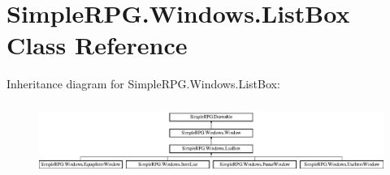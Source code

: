 \hypertarget{class_simple_r_p_g_1_1_windows_1_1_list_box}{\section{Simple\-R\-P\-G.\-Windows.\-List\-Box Class Reference}
\label{class_simple_r_p_g_1_1_windows_1_1_list_box}
}
Inheritance diagram for Simple\-R\-P\-G.\-Windows.\-List\-Box\-:\begin{figure}[H]
\begin{center}
\leavevmode
\includegraphics[height=2.362869cm]{class_simple_r_p_g_1_1_windows_1_1_list_box}
\end{center}
\end{figure}
